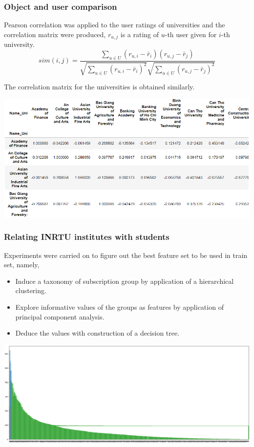 \documentclass[10pt,dvipsnames]{beamer}
\newcommand{\irnitu}{INRTU}
\begin{document}
\begin{frame}
  \frametitle{Object and user comparison}
  Pearson correlation was applied to the user ratings of universities and the correlation matrix were produced, $r_{u,j}$ is a rating of $u$-th user given for $i$-th university.
  $$sim(i,j)=\frac{\sum_{u\in U}(r_{u,i}-\bar{r}_i)(r_{u,j}-\bar{r}_j)}{\sqrt{\sum_{u\in U}(r_{u,i}-\bar{r}_i)^2}\sqrt{\sum_{u\in U}(r_{u,j}-\bar{r}_j)^2}}$$ %

The correlation matrix for the universities is obtained similarly.

  \includegraphics[width=\linewidth]{pics/ratings-corr.png}
\end{frame}

\begin{frame}
  \frametitle{Relating \irnitu{} institutes with students}
  Experiments were carried on to figure out the best feature set to be used in train set, namely,
  \begin{itemize}
  \item Induce a taxonomy of subscription group by application of a hierarchical clustering.
  \item Explore informative values of the groups as features by application of principal component analysis.
  \item Deduce the values with construction of a decision tree.
  \end{itemize}
  \vspace{2em}
  \centering
  \includegraphics[width=0.8\linewidth]{pics/hclustering.png}
\end{frame}
\end{document}
